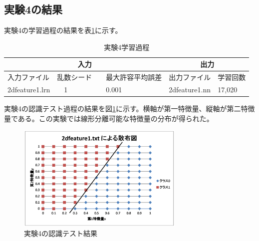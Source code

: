 \documentclass[final]{jarticle}[2012/05/15]
\begin{document}
\subsection{実験4の結果}
実験4の学習過程の結果を表\ref{zi_ga_4}に示す。\par
\begin{table}[h]
  \begin{center}
    \caption{実験4学習過程} \label{zi_ga_4}
    \begin{tabular}{|l|l|l|l|l|}\hline
    \multicolumn{3}{|c|}{入力} & \multicolumn{2}{|c|}{出力} \\ \hline
    入力ファイル & 乱数シード &　最大許容平均誤差 & 出力ファイル & 学習回数 \\ \hline
    2dfeature1.lrn &　1 &　0.001 & 2dfeature1.nn & 17,020 \\ \hline
    \end{tabular}
  \end{center}
\end{table}
実験4の認識テスト過程の結果を図\ref{zi_ke_4}に示す。横軸が第一特徴量、縦軸が第二特徴量である。この実験では線形分離可能な特徴量の分布が得られた。\par
\begin{figure}[htbp]
  \centering
  \includegraphics[width=8cm]{2dfeature1.eps}
  \caption{実験4の認識テスト結果} \label{zi_ke_4}
\end{figure}
\pagebreak
\end{document}
